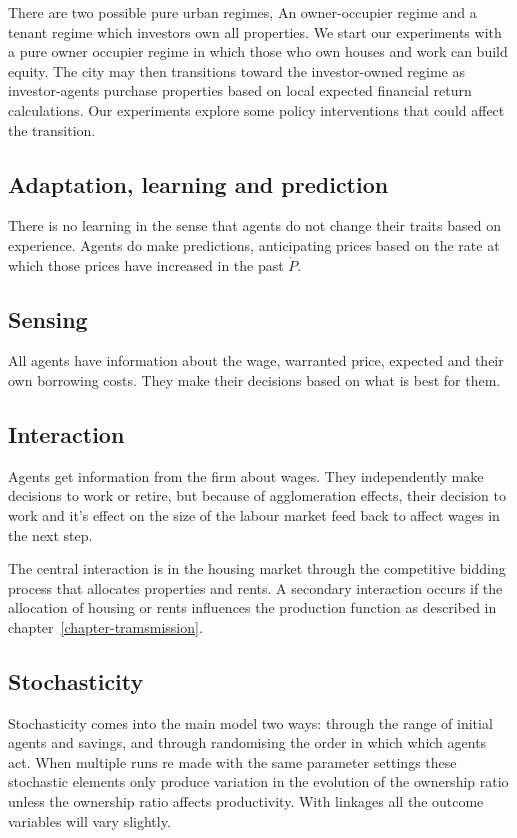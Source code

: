 There are two possible pure urban regimes, An owner-occupier regime and a tenant regime which investors own all properties. We start our experiments with a pure owner occupier regime in which those who own houses and work can build equity.  The city may then transitions toward the investor-owned regime as investor-agents purchase properties based on local expected financial return calculations. Our experiments explore some policy interventions that could affect the transition.


\subsection{Adaptation, learning and prediction}
There is no learning in the sense that agents do not change their traits based on experience. 
Agents do make predictions, anticipating prices based on the rate at which those prices have increased in the past $\dot P$.

\subsection{Sensing}
All agents have information about the wage, warranted price, expected and their own borrowing costs. They make their decisions based on what is best for them. 

\subsection{Interaction}
Agents get information from the firm about wages. They independently make decisions to work or retire, but because of agglomeration effects, their decision to work and it's effect on the size of the labour market feed back to affect wages in the next step. 

The central interaction  is in the housing market through the competitive bidding process that allocates properties and rents.  A secondary interaction occurs if the allocation of housing or rents influences the production function as described in chapter~\ref{chapter-tramsmission}.

\subsection{Stochasticity}
Stochasticity comes into the main model two ways: through the range of initial agents and savings, and through randomising the order in which which agents act. When multiple runs re made with the same parameter settings these stochastic elements only produce variation in the evolution of the ownership ratio unless the ownership ratio affects productivity. With linkages all the outcome variables will vary slightly.

